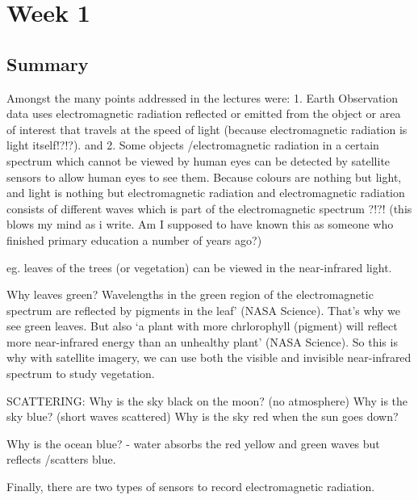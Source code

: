 \documentclass[
  letterpaper,
  DIV=11,
  numbers=noendperiod]{scrreprt}
\author{}
\date{}
\begin{document}
\ifdefined\Shaded\renewenvironment{Shaded}{\begin{tcolorbox}[borderline west={3pt}{0pt}{shadecolor}, frame hidden, enhanced, breakable, boxrule=0pt, sharp corners, interior hidden]}{\end{tcolorbox}}\fi

\hypertarget{week-1}{%
\chapter{Week 1}\label{week-1}}

\hypertarget{summary}{%
\section{Summary}\label{summary}}

Amongst the many points addressed in the lectures were: 1. Earth
Observation data uses electromagnetic radiation reflected or emitted
from the object or area of interest that travels at the speed of light
(because electromagnetic radiation is light itself!?!?). and 2. Some
objects /electromagnetic radiation in a certain spectrum which cannot be
viewed by human eyes can be detected by satellite sensors to allow human
eyes to see them. Because colours are nothing but light, and light is
nothing but electromagnetic radiation and electromagnetic radiation
consists of different waves which is part of the electromagnetic
spectrum ?!?! (this blows my mind as i write. Am I supposed to have
known this as someone who finished primary education a number of years
ago?)

eg. leaves of the trees (or vegetation) can be viewed in the
near-infrared light.

Why leaves green? Wavelengths in the green region of the electromagnetic
spectrum are reflected by pigments in the leaf' (NASA Science). That's
why we see green leaves. But also `a plant with more chrlorophyll
(pigment) will reflect more near-infrared energy than an unhealthy
plant' (NASA Science). So this is why with satellite imagery, we can use
both the visible and invisible near-infrared spectrum to study
vegetation.

SCATTERING: Why is the sky black on the moon? (no atmosphere) Why is the
sky blue? (short waves scattered) Why is the sky red when the sun goes
down?

Why is the ocean blue? - water absorbs the red yellow and green waves
but reflects /scatters blue.

Finally, there are two types of sensors to record electromagnetic
radiation.
\end{document}
